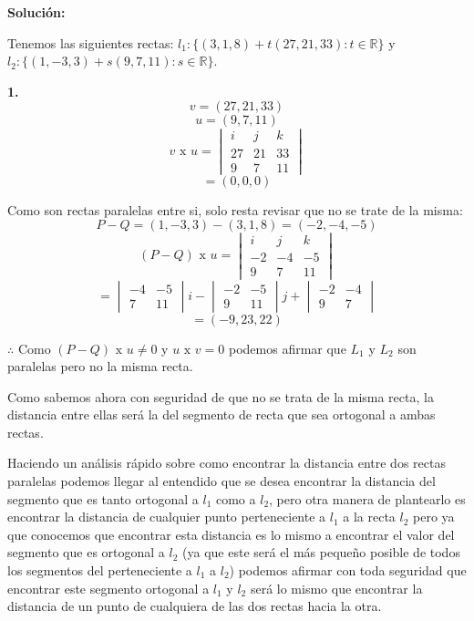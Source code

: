 \documentclass{article}
\begin{document}
\textbf{Solución:}
\vspace{10pt}

Tenemos las siguientes rectas: $l_1: \{(3, 1, 8)+t(27,21,33): t \in \mathbb{R}\}$ y $l_2: \{(1,-3,3)+s(9,7,11): s \in \mathbb{R}\}$.

\begin{minipage}[c]{0.5cm}
    \textbf{1.}
    $$v =(27, 21, 33)$$
    $$u =(9,7,11)$$
    $$v \text{ x } u = \begin{vmatrix}
        i & j & k \\
        27 & 21 & 33 \\
        9 & 7 & 11
    \end{vmatrix}$$
    $$=(0, 0, 0)$$
\end{minipage}

Como son rectas paralelas entre si, solo resta revisar que no se trate de la misma:
$$P-Q = (1,-3,3)- (3,1,8) = (-2, -4, -5 )$$
    $$(P-Q) \text{ x } u = \begin{vmatrix}
        i & j & k \\
        -2 & -4 & -5 \\
        9 & 7 & 11
    \end{vmatrix}$$
    $$= \begin{vmatrix}
        -4 & -5 \\
        7 & 11 
    \end{vmatrix}i - \begin{vmatrix}
        -2 & -5 \\
        9 & 11
    \end{vmatrix}j + \begin{vmatrix}
        -2 & -4 \\
        9 & 7
    \end{vmatrix}$$
    $$=(-9, 23, 22)$$

$\therefore$ Como $(P-Q) \text{ x } u\neq 0$ y $ u \text{ x } v= 0 $ podemos afirmar que $L_1$ y $L_2$ son paralelas 
pero no la misma recta.

Como sabemos ahora con seguridad de que no se trata de la misma recta, la distancia entre ellas será la del segmento de recta que 
sea ortogonal a ambas rectas. 

Haciendo un análisis rápido sobre como encontrar la distancia entre dos rectas paralelas podemos llegar al entendido que se desea encontrar 
la distancia del segmento que es tanto ortogonal a $l_1$ como a $l_2$, pero otra manera de plantearlo es encontrar la distancia de cualquier punto 
perteneciente a $l_1$ a la recta $l_2$ pero ya que conocemos que encontrar esta distancia es lo mismo a encontrar el valor del segmento que es ortogonal 
a $l_2$ (ya que este será el más pequeño posible de todos los segmentos del perteneciente a $l_1$ a $l_2$) podemos afirmar con toda seguridad que encontrar 
este segmento ortogonal a $l_1$ y $l_2$ será lo mismo que encontrar la distancia de un punto de cualquiera de las dos rectas hacia la otra.
\par
\end{document}
